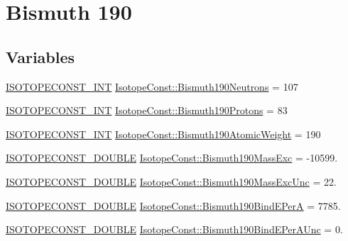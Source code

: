 \hypertarget{group___isotope_const-_bismuth-_bi190}{}\section{Bismuth 190}
\label{group___isotope_const-_bismuth-_bi190}
\subsection*{Variables}
\begin{DoxyCompactItemize}
\item 
\mbox{\hyperlink{group___isotope_const-_macros_ga5f18360b3e99483a35c32d789e62621c}{I\+S\+O\+T\+O\+P\+E\+C\+O\+N\+S\+T\+\_\+\+I\+NT}} \mbox{\hyperlink{group___isotope_const-_bismuth-_bi190_ga2678e4c67aa4656dcbf408418bcdf530}{Isotope\+Const\+::\+Bismuth190\+Neutrons}} = 107
\item 
\mbox{\hyperlink{group___isotope_const-_macros_ga5f18360b3e99483a35c32d789e62621c}{I\+S\+O\+T\+O\+P\+E\+C\+O\+N\+S\+T\+\_\+\+I\+NT}} \mbox{\hyperlink{group___isotope_const-_bismuth-_bi190_ga974d94ffb0c49b19e21c8c240c156034}{Isotope\+Const\+::\+Bismuth190\+Protons}} = 83
\item 
\mbox{\hyperlink{group___isotope_const-_macros_ga5f18360b3e99483a35c32d789e62621c}{I\+S\+O\+T\+O\+P\+E\+C\+O\+N\+S\+T\+\_\+\+I\+NT}} \mbox{\hyperlink{group___isotope_const-_bismuth-_bi190_ga9314f9b360250545c62c43aee2e7de9d}{Isotope\+Const\+::\+Bismuth190\+Atomic\+Weight}} = 190
\item 
\mbox{\hyperlink{group___isotope_const-_macros_ga8f45a7272ce02c0b4c65c44636ed719a}{I\+S\+O\+T\+O\+P\+E\+C\+O\+N\+S\+T\+\_\+\+D\+O\+U\+B\+LE}} \mbox{\hyperlink{group___isotope_const-_bismuth-_bi190_ga2192d377bfecb248a8537eb2b4a19a08}{Isotope\+Const\+::\+Bismuth190\+Mass\+Exc}} = -\/10599.
\item 
\mbox{\hyperlink{group___isotope_const-_macros_ga8f45a7272ce02c0b4c65c44636ed719a}{I\+S\+O\+T\+O\+P\+E\+C\+O\+N\+S\+T\+\_\+\+D\+O\+U\+B\+LE}} \mbox{\hyperlink{group___isotope_const-_bismuth-_bi190_gaf6e7230dc155a66d5db89d6d3aa7ad1a}{Isotope\+Const\+::\+Bismuth190\+Mass\+Exc\+Unc}} = 22.
\item 
\mbox{\hyperlink{group___isotope_const-_macros_ga8f45a7272ce02c0b4c65c44636ed719a}{I\+S\+O\+T\+O\+P\+E\+C\+O\+N\+S\+T\+\_\+\+D\+O\+U\+B\+LE}} \mbox{\hyperlink{group___isotope_const-_bismuth-_bi190_gac12846109f4edfb7ef189cade7a71266}{Isotope\+Const\+::\+Bismuth190\+Bind\+E\+PerA}} = 7785.
\item 
\mbox{\hyperlink{group___isotope_const-_macros_ga8f45a7272ce02c0b4c65c44636ed719a}{I\+S\+O\+T\+O\+P\+E\+C\+O\+N\+S\+T\+\_\+\+D\+O\+U\+B\+LE}} \mbox{\hyperlink{group___isotope_const-_bismuth-_bi190_gacf0188c48d3dcb78844663c1c12f204a}{Isotope\+Const\+::\+Bismuth190\+Bind\+E\+Per\+A\+Unc}} = 0.

\end{DoxyCompactItemize}
